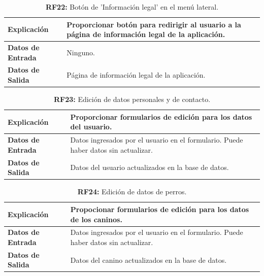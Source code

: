 \documentclass[a4paper, 12pt]{article}
\begin{document}
\begin{table}[H]
\captionsetup{justification=raggedright,singlelinecheck=false}
\caption{\textbf{RF22:} Botón de 'Información legal' en el menú lateral.}
\label{tab:RF22}
	\begin{tabular}{|m{5cm}|m{10cm}|}
	\hline
	\textbf{Explicación} & Proporcionar botón para redirigir al usuario a la página de información legal de la aplicación. \\ 
	\hline
	\textbf{Datos de Entrada} &  Ninguno. \\ 
	\hline
	\textbf{Datos de Salida} &  Página de información legal de la aplicación. \\ 
	\hline
\end{tabular}
\end{table}

\begin{table}[H]
\captionsetup{justification=raggedright,singlelinecheck=false}
\caption{\textbf{RF23:} Edición de datos personales y de contacto.}
\label{tab:RF23}
	\begin{tabular}{|m{5cm}|m{10cm}|}
	\hline
	\textbf{Explicación} & Proporcionar formularios de edición para los datos del usuario. \\ 
	\hline
	\textbf{Datos de Entrada} & Datos ingresados por el usuario en el formulario. Puede haber datos sin actualizar. \\ 
	\hline
	\textbf{Datos de Salida} &  Datos del usuario actualizados en la base de datos. \\ 
	\hline
\end{tabular}
\end{table}

\begin{table}[H]
\captionsetup{justification=raggedright,singlelinecheck=false}
\caption{\textbf{RF24:} Edición de datos de perros.}
\label{tab:RF24}
	\begin{tabular}{|m{5cm}|m{10cm}|}
	\hline
	\textbf{Explicación} & Propocionar formularios de edición para los datos de los caninos. \\ 
	\hline
	\textbf{Datos de Entrada} &  Datos ingresados por el usuario en el formulario. Puede haber datos sin actualizar.  \\ 
	\hline
	\textbf{Datos de Salida} &   Datos del canino actualizados en la base de datos. \\ 
	\hline
\end{tabular}
\end{table}
\end{document}
